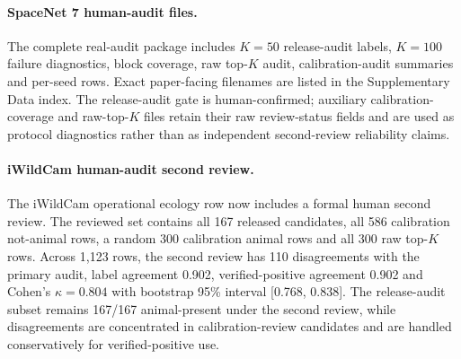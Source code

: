 \documentclass[11pt]{article}
\begin{document}
\begin{table}[h]
\centering
\caption{SpaceNet 7 human-audit operating checks. The \(K=100\) row is the pre-registered human-audit request and is interpreted as certified refusal. The \(K=50\) row is a diagnostic low-volume release confirmed by internal blind visual review, not a replacement for a \(K=100\) deployment claim.}
\small
{}
\end{table}

\paragraph{SpaceNet 7 human-audit files.}
The complete real-audit package includes \(K=50\) release-audit labels, \(K=100\) failure diagnostics, block coverage, raw top-\(K\) audit, calibration-audit summaries and per-seed rows.
Exact paper-facing filenames are listed in the Supplementary Data index.
The release-audit gate is human-confirmed; auxiliary calibration-coverage and raw-top-\(K\) files retain their raw review-status fields and are used as protocol diagnostics rather than as independent second-review reliability claims.

\paragraph{iWildCam human-audit second review.}
The iWildCam operational ecology row now includes a formal human second review.
The reviewed set contains all 167 released candidates, all 586 calibration not-animal rows, a random 300 calibration animal rows and all 300 raw top-\(K\) rows.
Across 1,123 rows, the second review has 110 disagreements with the primary audit, label agreement 0.902, verified-positive agreement 0.902 and Cohen's \(\kappa=0.804\) with bootstrap 95\% interval [0.768, 0.838].
The release-audit subset remains 167/167 animal-present under the second review, while disagreements are concentrated in calibration-review candidates and are handled conservatively for verified-positive use.
\end{document}
